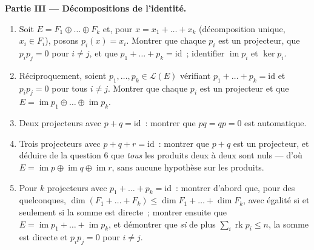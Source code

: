 \begin{problem}
\medskip
\noindent\textbf{Partie III --- Décompositions de l'identité.}
\begin{enumerate}[resume]
  \item Soit $E = F_1 \oplus \dots \oplus F_k$ et, pour $x = x_1 +
        \dots + x_k$ (décomposition unique, $x_i \in F_i$), posons
        $p_i(x) = x_i$. Montrer que chaque $p_i$ est un projecteur, que
        $p_i p_j = 0$ pour $i \neq j$, et que $p_1 + \dots + p_k
        = \mathrm{id}$~; identifier $\operatorname{im} p_i$ et
        $\ker p_i$.
  \item Réciproquement, soient $p_1, \dots, p_k \in \mathcal{L}(E)$
        vérifiant $p_1 + \dots + p_k = \mathrm{id}$ et $p_i p_j =
        0$ pour tous $i \neq j$. Montrer que chaque $p_i$ est un
        projecteur et que $E = \operatorname{im} p_1 \oplus
        \dots \oplus \operatorname{im} p_k$.
  \item Deux projecteurs avec $p + q = \mathrm{id}$~: montrer que $pq
        = qp = 0$ est automatique.
  \item Trois projecteurs avec $p + q + r = \mathrm{id}$~: montrer
        que $p + q$ est un projecteur, et déduire de la question 6
        que \emph{tous} les produits deux à deux sont nuls --- d'où $E =
        \operatorname{im} p \oplus \operatorname{im} q \oplus
        \operatorname{im} r$, sans aucune hypothèse sur les produits.
  \item Pour $k$ projecteurs avec $p_1 + \dots + p_k =
        \mathrm{id}$~: montrer d'abord que, pour des  quelconques, $\dim
        (F_1 + \dots + F_k) \leq \dim F_1 + \dots + \dim F_k$,
        avec égalité si et seulement si la somme est directe~; montrer
        ensuite que $E = \operatorname{im} p_1 + \dots +
        \operatorname{im} p_k$, et démontrer que \emph{si}
        de plus $\sum_i \operatorname{rk} p_i \leq n$, la somme
        est directe et $p_i p_j = 0$ pour $i \neq j$.
\end{enumerate}


\end{problem}
